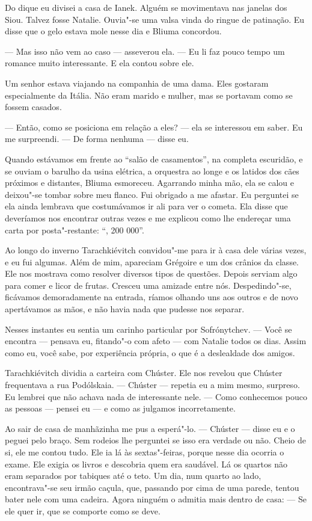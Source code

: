Do dique eu divisei a casa de Ianek. Alguém se movimentava nas janelas
dos Siou. Talvez fosse Natalie. Ouvia"-se uma valsa vinda do ringue de
patinação. Eu disse que o gelo estava mole nesse dia e Bliuma concordou.

--- Mas isso não vem ao caso --- asseverou ela. --- Eu li faz pouco
tempo um romance muito interessante. E ela contou sobre ele.

Um senhor estava viajando na companhia de uma dama. Eles gostaram
especialmente da Itália. Não eram marido e mulher, mas se portavam como
se fossem casados.

--- Então, como se posiciona em relação a eles? --- ela se interessou em
saber. Eu me surpreendi. --- De forma nenhuma --- disse eu.

Quando estávamos em frente ao ``salão de casamentos'', na completa
escuridão, e se ouviam o barulho da usina elétrica, a orquestra ao longe
e os latidos dos cães próximos e distantes, Bliuma esmoreceu. Agarrando
minha mão, ela se calou e deixou"-se tombar sobre meu flanco. Fui
obrigado a me afastar. Eu perguntei se ela ainda lembrava que
costumávamos ir ali para ver o cometa. Ela disse que deveríamos nos
encontrar outras vezes e me explicou como lhe endereçar uma carta por
posta"-restante: ``\scalebox{.8}{K"-K"-B}, 200 000''.

Ao longo do inverno Tarachkiévitch convidou"-me para ir à casa dele
várias vezes, e eu fui algumas. Além de mim, apareciam Grégoire e um dos
crânios da classe. Ele nos mostrava como resolver diversos tipos de
questões. Depois serviam algo para comer e licor de frutas. Cresceu uma
amizade entre nós. Despedindo"-se, ficávamos demoradamente na entrada,
ríamos olhando uns aos outros e de novo apertávamos as mãos, e não havia
nada que pudesse nos separar.

Nesses instantes eu sentia um carinho particular por Sofrónytchev. ---
Você se encontra --- pensava eu, fitando"-o com afeto --- com Natalie
todos os dias. Assim como eu, você sabe, por experiência própria, o que
é a deslealdade dos amigos.

Tarachkiévitch dividia a carteira com Chúster. Ele nos revelou que
Chúster frequentava a rua Podólskaia. --- Chúster --- repetia eu a mim %
mesmo, surpreso. Eu lembrei que não achava nada de interessante nele.
--- Como conhecemos pouco as pessoas --- pensei eu --- e como as
julgamos incorretamente.

Ao sair de casa de manhãzinha me pus a esperá"-lo. --- Chúster --- disse
eu e o peguei pelo braço. Sem rodeios lhe perguntei se isso era verdade
ou não. Cheio de si, ele me contou tudo. Ele ia lá às sextas"-feiras,
porque nesse dia ocorria o exame. Ele exigia os livros e descobria quem
era saudável. Lá os quartos não eram separados por tabiques até o teto.
Um dia, num quarto ao lado, encontrava"-se seu irmão caçula, que,
passando por cima de uma parede, tentou bater nele com uma cadeira.
Agora ninguém o admitia mais dentro de casa: --- Se ele quer ir, que se
comporte como se deve.

